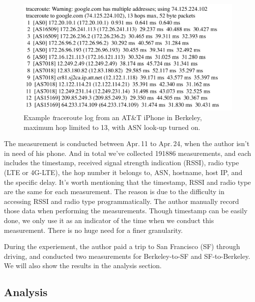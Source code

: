 \begin{figure}[!htb]
  \centering
  \includegraphics[width=1.1\linewidth]{../figs/traceroute.pdf}
  \vspace{-1em}
  \caption{Example {\textit traceroute} log from an AT\&T iPhone in Berkeley, maximum hop limited to 13, with ASN look-up turned on.}
  \label{fig:traceroute}
\end{figure}


The measurement is conducted between Apr.\,11 to Apr.\,24, when the author isn't in need of his phone. And in total we've collected 191886 measurements, and each includes the timestamp, received signal strength indication (RSSI), radio type (LTE or 4G-LTE), the hop number it belongs to, ASN, hostname, host IP, and the specific delay. It's worth mentioning that the timestamp, RSSI and radio type are the same for each measurement. The reason is due to the difficulty in accessing RSSI and radio type programmatically. The author manually record those data when performing the measurements. Though timestamp can be easily done, we only use it as an indicator of the time when we conduct this measurement. There is no huge need for a finer granularity.

During the experiement, the author paid a trip to San Francisco (SF) through driving, and conducted two measurements for Berkeley-to-SF and SF-to-Berkeley. We will also show the results in the analysis section. 


\subsection{Analysis}
\label{sec:analysis}

